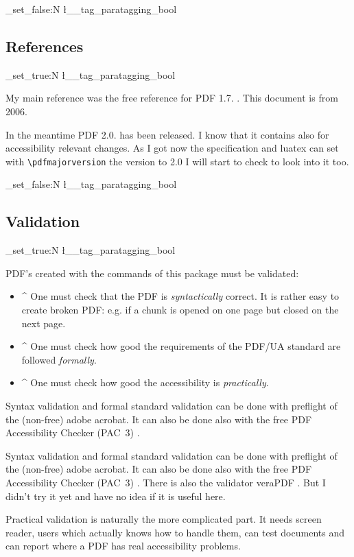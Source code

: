 \documentclass[DIV=12,parskip=half-,bibliography=totoc]{scrartcl}
\newcommand\PDF{PDF}
\newcommand\parataggingON {\bool_set_true:N \l__tag_paratagging_bool}
\newcommand\parataggingOff{\bool_set_false:N \l__tag_paratagging_bool}
\begin{document}
\parataggingOff


\subsection{References}

\parataggingON

My main reference was the free reference for \PDF{} 1.7. \parencite{pdfreference}. This document is from 2006.

In the meantime \PDF{} 2.0. has been released.
I know that it contains also for accessibility relevant changes.
As I got now the specification and luatex can set with \verb+\pdfmajorversion+
the version to 2.0 I will start to check to look into it too.%

\parataggingOff

\subsection{Validation}

\parataggingON

\PDF{}'s created with the commands of this package must be validated:

\begin{itemize}
\item
\TagP^ One must check that the \PDF{} is \emph{syntactically} correct. It is rather easy to create broken \PDF{}: e.g. if a chunk is opened on one page but closed on the next page.
    \Pmeti
\item
\TagP^ One must check how good the requirements of the PDF/UA standard are followed \emph{formally}.
    \Pmeti
\item
\TagP^ One must check how good the accessibility is \emph{practically}.\Pmeti
\end{itemize}


Syntax validation and formal standard validation can be done with preflight of the (non-free) adobe acrobat.
It can also be done also with the free \PDF{} Accessibility Checker (PAC~3) \parencite{pac3}.

Syntax validation and formal standard validation can be done with preflight of the (non-free) adobe acrobat.
It can also be done also with the free \PDF{} Accessibility Checker (PAC~3) \parencite{pac3}.
There is also the validator veraPDF \parencite{verapdf}. But I didn't try it yet and have no idea if it is useful here.

Practical validation is naturally the more complicated part. It needs screen reader, users which actually knows how to handle them, can test documents and can report where a \PDF{} has real accessibility problems.
\end{document}
